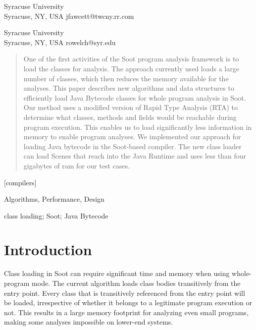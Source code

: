 \documentclass[preprint]{sigplanconf}
\begin{document}
           {Syracuse University\\Syracuse, NY, USA}
           {jfawcett@twcny.rr.com}        
 
           {Syracuse University\\Syracuse, NY, USA}
           {rowelch@syr.edu}       
    
           

\maketitle

\begin{abstract}
One of the first activities of the Soot program analysis framework is to load the classes for analysis. The approach currently used loads a large number of classes, which then reduces the memory available for the analyses.
This paper describes new algorithms and data structures to efficiently load Java Bytecode classes for whole program analysis in Soot. Our method uses a modified version of Rapid Type Analysis (RTA) to determine what classes, methods and fields would be reachable during program execution. This enables us to load significantly less information in memory to enable program analyses.
We implemented our approach for loading Java bytecode in the Soot-based \rb compiler. The new class loader can load Scenes that reach into the Java Runtime and uses less than four gigabytes of ram for our test cases.
\end{abstract}

[compilers]

\terms
Algorithms, Performance, Design

\keywords
class loading; Soot; Java Bytecode

\section{Introduction}
\label{sec:intro}
Class loading in Soot \cite{soot-retro, soot-orig} can require significant time and memory when using whole-program mode. 
The current algorithm loads class bodies transitively from the entry point. Every class that is transitively referenced from the entry point will be loaded, irrespective of whether it belongs to a legitimate program execution or not. This results in a large memory footprint for analyzing even small programs, making some analyses impossible on lower-end systems.
\end{document}
